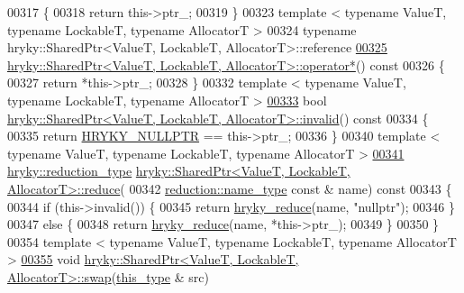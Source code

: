 \begin{DoxyCode}
00317 \textcolor{keyword}{}\{
00318     \textcolor{keywordflow}{return} this->ptr\_;
00319 \}
00323 \textcolor{keyword}{template} < \textcolor{keyword}{typename} ValueT, \textcolor{keyword}{typename} LockableT, \textcolor{keyword}{typename} AllocatorT >
00324 \textcolor{keyword}{typename} hryky::SharedPtr<ValueT, LockableT, AllocatorT>::reference
\hypertarget{shared__ptr_8h_source_l00325}{}\hyperlink{classhryky_1_1_shared_ptr_ad7132caf81766715ba384f576e2b1b62}{00325} \hyperlink{classhryky_1_1_shared_ptr}{hryky::SharedPtr<ValueT, LockableT, AllocatorT>::operator*}()\textcolor{keyword}{ const}
00326 \textcolor{keyword}{}\{
00327     \textcolor{keywordflow}{return} *this->ptr\_;
00328 \}
00332 \textcolor{keyword}{template} < \textcolor{keyword}{typename} ValueT, \textcolor{keyword}{typename} LockableT, \textcolor{keyword}{typename} AllocatorT >
\hypertarget{shared__ptr_8h_source_l00333}{}\hyperlink{classhryky_1_1_shared_ptr_a9d49dd75843e0643e8caffd7f740a802}{00333} \textcolor{keywordtype}{bool} \hyperlink{classhryky_1_1_shared_ptr}{hryky::SharedPtr<ValueT, LockableT, AllocatorT>::invalid}()\textcolor{keyword}{ const}
00334 \textcolor{keyword}{}\{
00335     \textcolor{keywordflow}{return} \hyperlink{common_8h_a4cd4ac09cfcdbd6b30ee69afc156e210}{HRYKY_NULLPTR} == this->ptr\_;
00336 \}
00340 \textcolor{keyword}{template} < \textcolor{keyword}{typename} ValueT, \textcolor{keyword}{typename} LockableT, \textcolor{keyword}{typename} AllocatorT >
\hypertarget{shared__ptr_8h_source_l00341}{}\hyperlink{classhryky_1_1_shared_ptr_a27d2068eec13586b1998d337eceffbad}{00341} \hyperlink{classhryky_1_1_intrusive_ptr}{hryky::reduction_type} \hyperlink{namespacehryky_af41cb3af6766761da0ff21b84527a52c}{hryky::SharedPtr<ValueT, LockableT, AllocatorT>::reduce}(
00342     \hyperlink{classhryky_1_1reduction_1_1_string}{reduction::name_type} \textcolor{keyword}{const} & name)\textcolor{keyword}{ const}
00343 \textcolor{keyword}{}\{
00344     \textcolor{keywordflow}{if} (this->invalid()) \{
00345         \textcolor{keywordflow}{return} \hyperlink{reduction__common_8h_afc72326c9900838c5db40438318794dd}{hryky_reduce}(name, \textcolor{stringliteral}{"nullptr"});
00346     \}
00347     \textcolor{keywordflow}{else} \{
00348         \textcolor{keywordflow}{return} \hyperlink{reduction__common_8h_afc72326c9900838c5db40438318794dd}{hryky_reduce}(name, *this->ptr\_);
00349     \}
00350 \}
00354 \textcolor{keyword}{template} < \textcolor{keyword}{typename} ValueT, \textcolor{keyword}{typename} LockableT, \textcolor{keyword}{typename} AllocatorT >
\hypertarget{shared__ptr_8h_source_l00355}{}\hyperlink{classhryky_1_1_shared_ptr_a31ff2b6615bf4240b3ec8bcbcc06acc0}{00355} \textcolor{keywordtype}{void} \hyperlink{namespacehryky_a4282146df5ea2b68cb667896a2205909}{hryky::SharedPtr<ValueT, LockableT, AllocatorT>::swap}(\hyperlink{classhryky_1_1_shared_ptr}{this_type} & src)

\end{DoxyCode}
